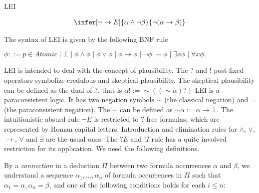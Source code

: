\begin{entry}{LEI}
\begin{calculus}
\[\begin{array}{ccccccccccccccc}
  &
  \quad
  &
  
  
  \infer[\neg\to E]{\alpha \land \neg\beta}{\neg(\alpha \to \beta)}
  
  &
  \quad
  &
  
%  
%  
%  
  
  \end{array}
\]
\vspace{-1em}

\end{calculus}


\begin{clarifications}
  The syntax of LEI is given by the following BNF rule
  \begin{center} 
    \begin{math}
        \phi ::= p \in Atomic \mid \bot \mid \phi \land \phi 
                 \mid \phi \lor \phi \mid \phi \rightarrow \phi 
                 \mid \neg \phi \mid \sim \phi \mid \exists x\phi 
                 \mid \forall x\phi.
    \end{math}
  \end{center}
  
  LEI is intended to deal with the concept of plausibility. The $?$ and $!$
  post-fixed operators symbolize credulous and skeptical plausibility. The
  skeptical plausibility can be defined as the dual of $?$, that is $\alpha ! :=
  \sim ((\sim \alpha)?)$ LEI is a paraconsistent logic. It has two negation
  symbols $\sim$ (the classical negation) and $\neg$ (the paraconsistent
  negation). The $\sim$ can be defined as $\sim \alpha := \alpha \to \bot$. The
  intuitionistic absurd rule $\neg E$ is restricted to $?$-free formulas, which
  are represented by Roman capital letters. Introduction and elimination rules for
  $\land$, $\lor$, $\to$, $\forall$ and $\exists$ are the usual ones. The $?E$ and
  $!I$ rule has a quite involved restriction for its application. We need the
  following definitions.
  
  By a \emph{connection} in a deduction $\Pi$ between two formula occurrences
  $\alpha$ and $\beta$, we understand a sequence $\alpha_{1},\ldots,\alpha_{n}$ of
  formula occurrences in $\Pi$ such that $\alpha_{1}=\alpha, \alpha_{n}=\beta$,
  and one of the following conditions holds for each $i \leq n$:


\end{clarifications}
\end{entry}
